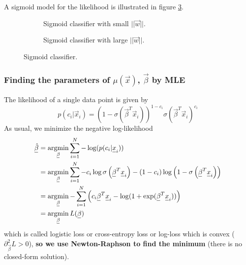 A sigmoid model for the likelihood is illustrated in figure \ref{fig:sigmoid_classifier}.

\begin{figure}

    \centering
    \begin{subfigure}{0.55\textwidth}
      \centering
      
      \caption{Sigmoid classifier with small $||\vec{w}||$.}
      \label{fig:sigmoid_classifier_small}
    \end{subfigure}%

    \begin{subfigure}{0.55\textwidth}
        \centering
        
        \caption{Sigmoid classifier with large $||\vec{w}||$.}
        \label{fig:sigmoid_classifier_large}
      \end{subfigure}

    \caption{Sigmoid classifier.}
    \label{fig:sigmoid_classifier}

\end{figure}

\subsubsection{Finding the parameters of $\mu(\vec{x})$, $\vec{\beta}$ by MLE}
The likelihood of a single data point is given by
\begin{equation}
    p(c_i | \vec{x}_i) = (1 - \sigma(\vec{\beta}^T \vec{x}_i))^{1 - c_i} \sigma(\vec{\beta}^T \vec{x}_i)^{c_i}
\end{equation}
As usual, we minimize the negative log-likelihood
\begin{equation}
    \begin{aligned}
        \vec{\hat{\beta}} &= \argmin_{\vec{\beta}} \sum_{i=1}^N -\log(p(c_i | \vec{x}_i)) \\
        &=\argmin_{\vec{\beta}} \sum_{i=1}^N-c_i \log \sigma\left(\vec{\beta}^T \vec{x}_i\right)-\left(1-c_i\right) \log \left(1-\sigma\left(\vec{\beta}^T \vec{x}_i\right)\right) \\
        &=\argmin_{\vec{\beta}} -\sum_{i=1}^N \left( c_i \vec{\beta}^T \vec{x}_i - \log(1 + \exp(\vec{\beta}^T \vec{x}_i)) \right) \\
        &=\argmin_{\vec{\beta}} L(\vec{\beta})
    \end{aligned}
\end{equation}
which is called \textcolor{blue1}{logistic loss} or \textcolor{blue1}{cross-entropy loss} or 
\textcolor{blue1}{log-loss} which is convex ($\partial_\vec{\beta}^2 L > 0$), \textbf{so we use Newton-Raphson to find the minimum}
(there is no closed-form solution).


